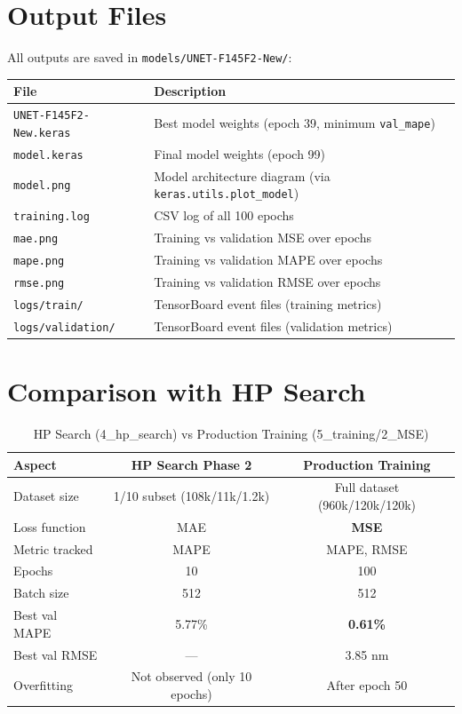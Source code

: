 \documentclass[11pt,a4paper]{article}
\begin{document}
\section{Output Files}

All outputs are saved in \texttt{models/UNET-F145F2-New/}:

\begin{table}[H]
\centering
\begin{tabular}{ll}
\toprule
\textbf{File} & \textbf{Description} \\
\midrule
\texttt{UNET-F145F2-New.keras} & Best model weights (epoch 39, minimum \texttt{val\_mape}) \\
\texttt{model.keras} & Final model weights (epoch 99) \\
\texttt{model.png} & Model architecture diagram (via \texttt{keras.utils.plot\_model}) \\
\texttt{training.log} & CSV log of all 100 epochs \\
\texttt{mae.png} & Training vs validation MSE over epochs \\
\texttt{mape.png} & Training vs validation MAPE over epochs \\
\texttt{rmse.png} & Training vs validation RMSE over epochs \\
\texttt{logs/train/} & TensorBoard event files (training metrics) \\
\texttt{logs/validation/} & TensorBoard event files (validation metrics) \\
\bottomrule
\end{tabular}
\end{table}

\section{Comparison with HP Search}

\begin{table}[H]
\centering
\caption{HP Search (4\_hp\_search) vs Production Training (5\_training/2\_MSE)}
\begin{tabular}{lcc}
\toprule
\textbf{Aspect} & \textbf{HP Search Phase 2} & \textbf{Production Training} \\
\midrule
Dataset size & 1/10 subset (108k/11k/1.2k) & Full dataset (960k/120k/120k) \\
Loss function & MAE & \textbf{MSE} \\
Metric tracked & MAPE & MAPE, RMSE \\
Epochs & 10 & 100 \\
Batch size & 512 & 512 \\
Best val MAPE & 5.77\% & \textbf{0.61\%} \\
Best val RMSE & — & 3.85 nm \\
Overfitting & Not observed (only 10 epochs) & After epoch 50 \\
\bottomrule
\end{tabular}
\end{table}
\end{document}
